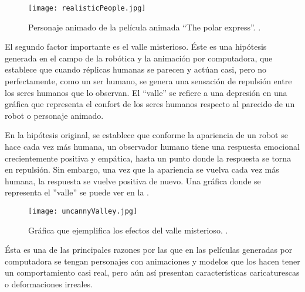 \begin{figure}[!ht]
	\centering
		\texttt{[image: realisticPeople.jpg]}
	\caption[Personaje animado realista.]{Personaje animado de la película animada “The polar express”. \citep{realisticPeople}.}
	\label{fig:realisticPeople}
\end{figure}


El segundo factor importante es el valle misterioso. Éste es una hipótesis generada en el campo de la robótica y la animación por computadora, que establece que cuando réplicas humanas se parecen y actúan casi, pero no perfectamente, como un ser humano, se genera una sensación de repulsión entre los seres humanos que lo observan. El “valle” se refiere a una depresión en una gráfica que representa el confort de los seres humanos respecto al parecido de un robot o personaje animado.

En la hipótesis original, se establece que conforme la apariencia de un robot se hace cada vez más humana, un observador humano tiene una respuesta emocional crecientemente positiva y empática, hasta un punto donde la respuesta se torna en repulsión. Sin embargo, una vez que la apariencia se vuelva cada vez más humana, la respuesta se vuelve positiva de nuevo. Una gráfica donde se representa el ''valle'' se puede ver en la .

\begin{figure}[!ht]
	\centering
		\texttt{[image: uncannyValley.jpg]}
	\caption[Gráfica del valle misterioso.]{Gráfica que ejemplifica los efectos del valle misterioso. \citep{uncannyValley}.}
	\label{fig:uncannyValley}
\end{figure}

Ésta es una de las principales razones por las que en las películas generadas por computadora se tengan personajes con animaciones y modelos que los hacen tener un comportamiento casi real, pero aún así presentan características caricaturescas o deformaciones irreales.

